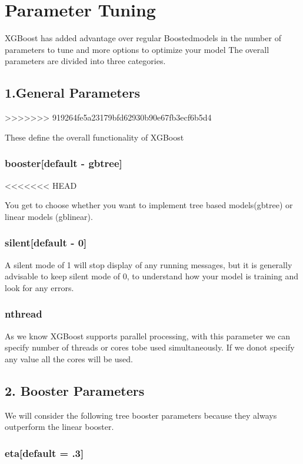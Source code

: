 \section{Parameter Tuning} 

XGBoost has added advantage over regular Boostedmodels in the number of parameters 
to tune and more options to optimize your model The overall parameters are divided 
into three categories.

\subsection{1.General Parameters}
>>>>>>> 919264fe5a23179bfd62930b90e67fb3ecf6b5d4

These define the overall functionality of XGBoost

\subsubsection{booster[default - gbtree]}  
<<<<<<< HEAD

You get to choose whether you want to implement tree based models(gbtree) or
linear  models (gblinear).

\subsubsection{silent[default - 0]}

A silent mode of 1 will stop display of any running messages, but it is
generally  advisable to keep silent mode of 0, to understand how your model is
training and  look for any errors.

\subsubsection{nthread} 

As we know XGBoost supports parallel processing, with this parameter we can
specify number of threads or cores tobe used simultaneously. If we donot specify
any value  all the cores will be used.

\subsection{2. Booster Parameters} 

We will consider the following tree booster parameters because they always
outperform  the linear booster.

\subsubsection{eta[default = .3]} 

